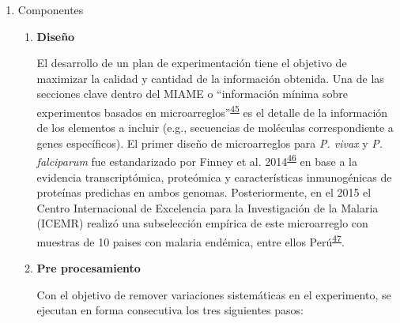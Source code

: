 \documentclass[a4paper]{article}
\begin{document}
\begin{enumerate}
\def\labelenumi{\alph{enumi}.}
\item
  Componentes

  \begin{enumerate}
  \def\labelenumii{\roman{enumii}.}
  \item
    \textbf{Diseño}

    El desarrollo de un plan de experimentación tiene el objetivo de
    maximizar la calidad y cantidad de la información obtenida. Una de
    las secciones clave dentro del MIAME o ``información mínima sobre
    experimentos basados en
    microarreglos''\textsuperscript{\protect\hyperlink{ref-brazma2001}{45}}
    es el detalle de la información de los elementos a incluir (e.g.,
    secuencias de moléculas correspondiente a genes específicos). El
    primer diseño de microarreglos para \emph{P. vivax} y \emph{P.
    falciparum} fue estandarizado por Finney et al.
    2014\textsuperscript{\protect\hyperlink{ref-Finney2014}{46}} en base
    a la evidencia transcriptómica, proteómica y características
    inmunogénicas de proteínas predichas en ambos genomas.
    Posteriormente, en el 2015 el Centro Internacional de Excelencia
    para la Investigación de la Malaria (ICEMR) realizó una subselección
    empírica de este microarreglo con muestras de 10 paises con malaria
    endémica, entre ellos
    Perú\textsuperscript{\protect\hyperlink{ref-King2015FOC}{47}}.
  \item
    \textbf{Pre procesamiento}

    Con el objetivo de remover variaciones sistemáticas en el
    experimento, se ejecutan en forma consecutiva los tres siguientes
    pasos:


\end{enumerate}
\end{enumerate}
\end{document}

